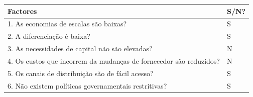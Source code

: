 \documentclass[11pt]{article}
\begin{document}
	\begin{adjustbox}{center}
		\begin{tabular}{|l|l|}
			\hline
			Factores                                                                                                                                                                                                 & S/N?                                                                                                                                       \\ \hline
			1. As economias de escalas são baixas?                                                                                                                                                                   & S                                                                                                                                          \\ \hline
			2. A diferenciação é baixa?                                                                                                                                                                              & S                                                                                                                                          \\ \hline
			3. As necessidades de capital não são elevadas?                                                                                                                                                          & N                                                                                                                                          \\ \hline
			4. Os custos que incorrem da mudanças de fornecedor são reduzidos?                                                                                                                                       & N                                                                                                                                          \\ \hline
			5. Os canais de distribuição são de fácil acesso?                                                                                                                                                        & S                                                                                                                                          \\ \hline
			6. Não existem políticas governamentais restritivas?                                                                                                                                                     & S                                                                                                                                          \\ \hline

\end{tabular}
\end{adjustbox}
\end{document}
